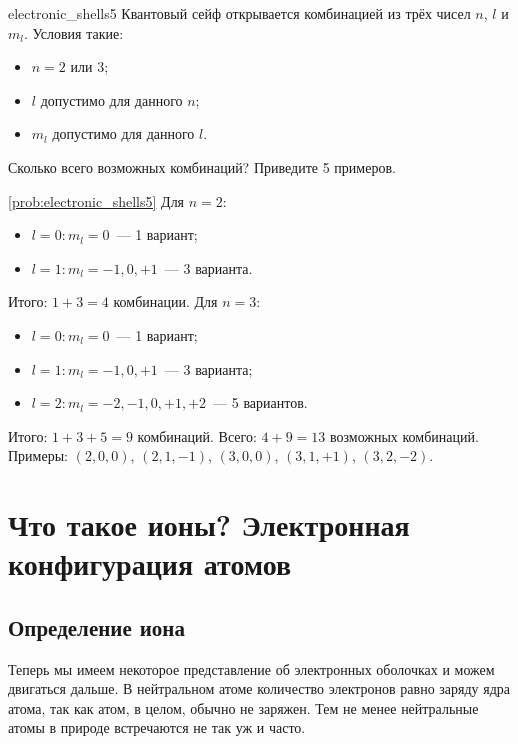 \begin{problem}{}{electronic_shells5}
    Квантовый сейф открывается комбинацией из трёх чисел $n$, $l$ и $m_l$. Условия такие:
    \begin{itemize}
        \item $n = 2$ или 3;
        \item $l$ допустимо для данного $n$;
        \item $m_l$ допустимо для данного $l$.
    \end{itemize}
    Сколько всего возможных комбинаций? Приведите 5 примеров.
    \begin{sol}{\ref{prob:electronic_shells5}}
        Для $n = 2$:
        \begin{itemize}
            \item $l=0: m_l = 0$~--- 1 вариант;
            \item $l=1: m_l = -1, 0, +1$~--- 3 варианта.
        \end{itemize}
        Итого: $1 + 3 = 4$ комбинации.
        Для $n = 3$:
        \begin{itemize}
            \item $l = 0: m_l = 0$~--- 1 вариант;
            \item $l = 1: m_l = -1, 0, +1$~--- 3 варианта;
            \item $l = 2: m_l = -2, -1, 0, +1, +2$~--- 5 вариантов.
        \end{itemize}
        Итого: $1 + 3 + 5 = 9$ комбинаций.
        Всего: $4 + 9 = 13$ возможных комбинаций.
        Примеры: $(2, 0, 0)$, $(2, 1, -1)$, $(3, 0, 0)$, $(3, 1, +1)$, $(3, 2, -2)$.
    \end{sol}
\end{problem}

\clearpage

\section{Что такое ионы? Электронная конфигурация атомов}

\subsection*{Определение иона}

Теперь мы имеем некоторое представление об электронных оболочках и можем двигаться дальше. В нейтральном атоме количество электронов равно заряду ядра атома, так как атом, в целом, обычно не заряжен. Тем не менее нейтральные атомы в природе встречаются не так уж и часто.

